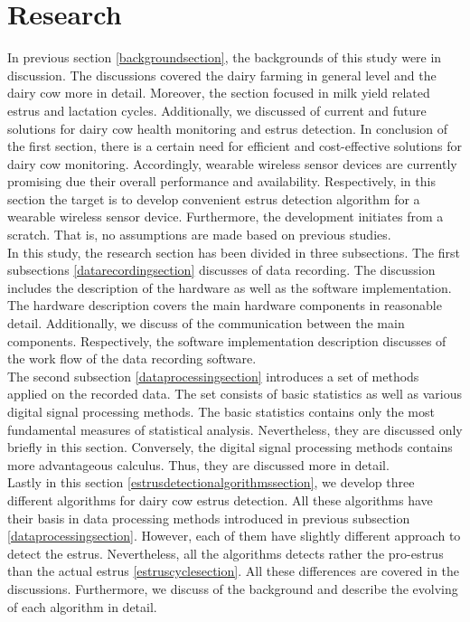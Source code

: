 \documentclass[english,12pt,a4paper,pdftex,elec,utf8]{aaltothesis}
\begin{document}
\clearpage

\section{Research} \label{researchsection}

In previous section \ref{backgroundsection}, the backgrounds of this study were in discussion. The discussions covered the dairy farming in general level and the dairy cow more in detail. Moreover, the section focused in milk yield related estrus and lactation cycles. Additionally, we discussed of current and future solutions for dairy cow health monitoring and estrus detection. In conclusion of the first section, there is a certain need for efficient and cost-effective solutions for dairy cow monitoring. Accordingly, wearable wireless sensor devices are currently promising due their overall performance and availability. Respectively, in this section the target is to develop convenient estrus detection algorithm for a wearable wireless sensor device. Furthermore, the development initiates from a scratch. That is, no assumptions are made based on previous studies. \\

In this study, the research section has been divided in three subsections. The first subsections \ref{datarecordingsection}  discusses of data recording. The discussion includes the description of the hardware as well as the software implementation. The hardware description covers the main hardware components in reasonable detail. Additionally, we discuss of the communication between the main components. Respectively, the software implementation description discusses of the work flow of the data recording software. \\

The second subsection \ref{dataprocessingsection} introduces a set of methods applied on the recorded data. The set consists of basic statistics as well as various digital signal processing methods. The basic statistics contains only the most fundamental measures of statistical analysis. Nevertheless, they are discussed only briefly in this section. Conversely, the digital signal processing methods contains more advantageous calculus. Thus, they are discussed more in detail. \\

Lastly in this section \ref{estrusdetectionalgorithmssection}, we develop three different algorithms for dairy cow estrus detection. All these algorithms have their basis in data processing methods introduced in previous subsection \ref{dataprocessingsection}. However, each of them have slightly different approach to detect the estrus. Nevertheless, all the algorithms detects rather the pro-estrus than the actual estrus \ref{estruscyclesection}. All these differences are covered in the discussions. Furthermore, we discuss of the background and describe the evolving of each algorithm in detail. \\
\end{document}
